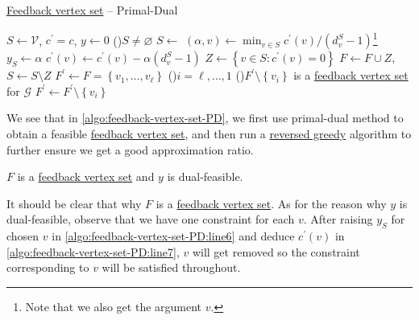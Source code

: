 \begin{algorithm}[H]\label{algo:feedback-vertex-set-PD}
	\DontPrintSemicolon
	\caption{\hyperref[prb:feedback-vertex-set]{Feedback vertex set} -- Primal-Dual}
	\BlankLine

	\(S\gets \mathcal{V} \), \(c^\prime = c\), \(y\gets 0\)
	\;
	\While(){\(S \neq \varnothing \)}{
		\(S\gets\) 
		\((\alpha, v) \gets \min _{v\in S} c^\prime (v) / (d_v^S - 1)\)\footnote{Note that we also get the argument \(v\).}
		\(y_S\gets \alpha\)\label{algo:feedback-vertex-set-PD:line6}\;
		\(c^\prime (v)\gets c^\prime (v) - \alpha (d_v^S - 1)\)\label{algo:feedback-vertex-set-PD:line7}\;
		\(Z\gets \left\{ v\in S\colon c^\prime (v) = 0 \right\} \)\;
		\(F\gets F\cup Z\), \(S\gets S \setminus Z\)\;
	}
	\;
	\(F^\prime \gets F = \left\{ v_1, \dots , v_{\ell} \right\} \)
	\For(\label{algo:feedback-vertex-set-PD:for}){\(i = \ell , \dots  , 1\)}{
		\If(){\(F^\prime \setminus \left\{ v_i \right\}\) is a \hyperref[prb:feedback-vertex-set]{feedback vertex set} for \(\mathcal{G} \)}{
			\(F^\prime \gets F^\prime \setminus \left\{ v_i \right\} \)\;
		}
	}
	\;
\end{algorithm}

We see that in \autoref{algo:feedback-vertex-set-PD}, we first use primal-dual method to obtain a feasible \hyperref[prb:feedback-vertex-set]{feedback vertex set}, and then run a \hyperref[rmk:reversed-greedy]{reversed greedy} algorithm to further ensure we get a good approximation ratio.

\begin{claim}
	\(F\) is a \hyperref[prb:feedback-vertex-set]{feedback vertex set} and \(y\) is dual-feasible.
\end{claim}
\begin{explanation}
	It should be clear that why \(F\) is a \hyperref[prb:feedback-vertex-set]{feedback vertex set}. As for the reason why \(y\) is dual-feasible, observe that we have one constraint for each \(v\). After raising \(y_S\) for chosen \(v\) in \autoref{algo:feedback-vertex-set-PD:line6} and deduce \(c^\prime (v)\) in \autoref{algo:feedback-vertex-set-PD:line7}, \(v\) will get removed so the constraint corresponding to \(v\) will be satisfied throughout.
\end{explanation}

